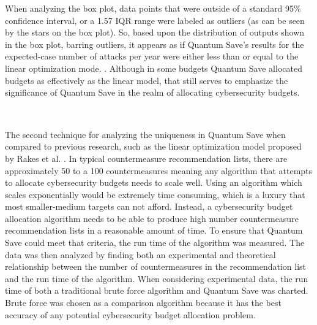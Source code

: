 When analyzing the box plot, data points that were outside of a standard 95\% confidence interval, or a 1.57 IQR range were labeled as outliers (as can be seen by the stars on the box plot). So, based upon the distribution of outputs shown in the box plot, barring outliers, it appears as if Quantum Save's results for the expected-case number of attacks per year were either less than or equal to the linear optimization mode. \cite{rakes_it_2012}. Although in some budgets Quantum Save allocated budgets as effectively as the linear model, that still serves to emphasize the significance of Quantum Save in the realm of allocating cybersecurity budgets. 

\subsection*{\color{SubSectionBlue}{Time Complexity of Quantum Save}}
 \\

The second technique for analyzing the uniqueness in Quantum Save when compared to previous research, such as the linear optimization model proposed by Rakes et al. \cite{rakes_it_2012}. In typical countermeasure recommendation lists, there are approximately 50 to a 100 countermeasures meaning any algorithm that attempts to allocate cybersecurity budgets needs to scale well. Using an algorithm which scales exponentially would be extremely time consuming, which is a luxury that most smaller-medium targets can not afford. Instead, a cybersecurity budget allocation algorithm needs to be able to produce high number countermeasure recommendation lists in a reasonable amount of time. To ensure that Quantum Save could meet that criteria, the run time of the algorithm was measured. The data was then analyzed by finding both an experimental and theoretical relationship between the number of countermeasures in the recommendation list and the run time of the algorithm. When considering experimental data, the run time of both a traditional brute force algorithm and Quantum Save was charted. Brute force was chosen as a comparison algorithm because it has the best accuracy of any potential cybersecurity budget allocation problem. 

